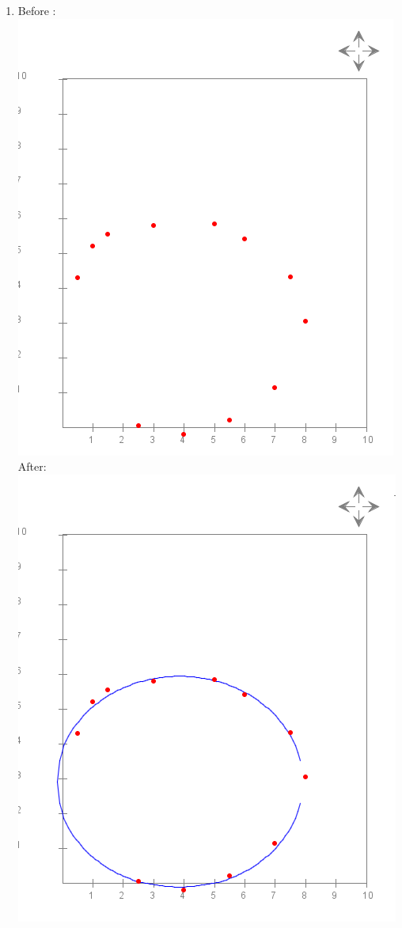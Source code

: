\documentclass{article}
\begin{document}
\begin{enumerate}
\item Before :\\
\includegraphics[scale=0.4]{module7_exercise17}\\
After:\\
\includegraphics[scale=0.4]{module7_exercise17_b}


\end{enumerate}
\end{document}

